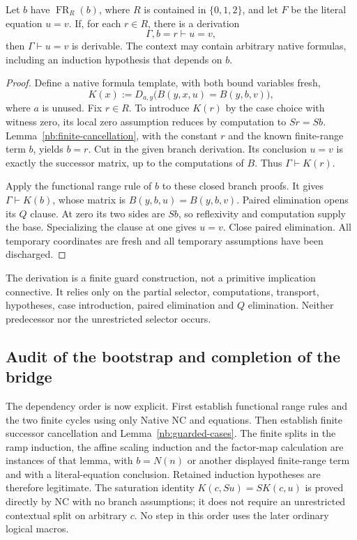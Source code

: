 \begin{lemma}
\label{nb:guarded-cases}
Let $b$ have $\operatorname{FR}_R(b)$, where $R$ is contained in
$\{0,1,2\}$, and let $F$ be the literal equation $u=v$.
If, for each $r\in R$, there is a derivation
\[
                         \Gamma,b=r\vdash u=v,
\]
then $\Gamma\vdash u=v$ is derivable.  The context may contain arbitrary
native formulas, including an induction hypothesis that depends on $b$.
\end{lemma}
\begin{proof}
Define a native formula template, with both bound variables fresh,
\[
 K(x):=D_{a,y}\bigl(B(y,x,u)=B(y,b,v)\bigr),
\]
where $a$ is unused.  Fix $r\in R$.  To introduce $K(r)$ by the case
choice with witness zero, its local zero assumption reduces by
computation to $Sr=Sb$.  Lemma~\ref{nb:finite-cancellation}, with the
constant $r$ and the known finite-range term $b$, yields $b=r$.
Cut in the given branch derivation.  Its conclusion $u=v$ is exactly
the successor matrix, up to the computations of $B$.  Thus
$\Gamma\vdash K(r)$.

Apply the functional range rule of $b$ to these closed branch proofs.
It gives $\Gamma\vdash K(b)$, whose matrix is
$B(y,b,u)=B(y,b,v)$.  Paired elimination opens its $Q$ clause.
At zero its two sides are $Sb$, so reflexivity and computation supply
the base.  Specializing the clause at one gives $u=v$.  Close paired
elimination.  All temporary coordinates are fresh and all temporary
assumptions have been discharged.
\end{proof}

The derivation is a finite guard construction, not a primitive implication
connective.  It relies only on the partial selector, computations,
transport, hypotheses, case introduction, paired elimination and $Q$
elimination.  Neither predecessor nor the unrestricted selector occurs.

\subsection{Audit of the bootstrap and completion of the bridge}

The dependency order is now explicit.  First establish functional range
rules and the two finite cycles using only Native NC and equations.
Then establish finite successor cancellation and
Lemma~\ref{nb:guarded-cases}.  The finite splits in the ramp induction,
the affine scaling induction and the factor-map calculation are instances
of that lemma, with $b=N(n)$ or another displayed finite-range term and
with a literal-equation conclusion.  Retained induction hypotheses are
therefore legitimate.  The saturation identity $K(c,Su)=S K(c,u)$ is
proved directly by NC with no branch assumptions; it does not require
an unrestricted contextual split on arbitrary $c$.  No step in this order
uses the later ordinary logical macros.

